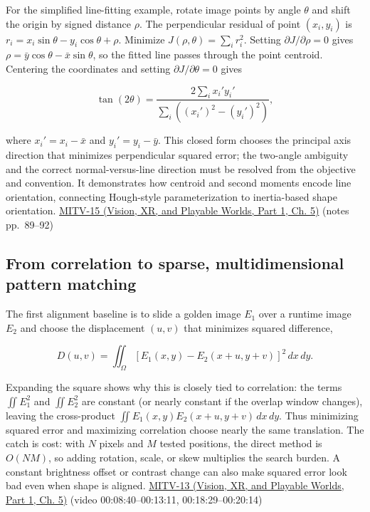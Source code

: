 For the simplified line-fitting example, rotate image points by angle \(\theta\) and shift the origin by signed distance \(\rho\). The perpendicular residual of point \((x_i,y_i)\) is \(r_i=x_i\sin\theta-y_i\cos\theta+\rho\). Minimize \(J(\rho,\theta)=\sum_i r_i^2\). Setting \(\partial J/\partial\rho=0\) gives \(\rho=\bar{y}\cos\theta-\bar{x}\sin\theta\), so the fitted line passes through the point centroid. Centering the coordinates and setting \(\partial J/\partial\theta=0\) gives

\[
\tan(2\theta)=\frac{2\sum_i x_i'y_i'}{\sum_i((x_i')^2-(y_i')^2)},
\]

where \(x_i'=x_i-\bar{x}\) and \(y_i'=y_i-\bar{y}\). This closed form chooses the principal axis direction that minimizes perpendicular squared error; the two-angle ambiguity and the correct normal-versus-line direction must be resolved from the objective and convention. It demonstrates how centroid and second moments encode line orientation, connecting Hough-style parameterization to inertia-based shape orientation. \href{../07-Vision-XR-and-Playable-Worlds-P01/main.pdf\#nameddest=04-visual-computing-ii-ch036-mitv-15---alignment-patmax-distance-field-filtering-and-sub-sampling-us-7065262}{MITV-15 (Vision, XR, and Playable Worlds, Part 1, Ch. 5)} (notes pp.~89--92)

\subsection{From correlation to sparse, multidimensional pattern matching}\label{04-visual-computing-ii-ch030-from-correlation-to-sparse-multidimensional-pattern-matching}

\hypertarget{04-visual-computing-ii-ch030-from-correlation-to-sparse-multidimensional-pattern-matching}{}

The first alignment baseline is to slide a golden image \(E_1\) over a runtime image \(E_2\) and choose the displacement \((u,v)\) that minimizes squared difference,

\[
D(u,v)=\iint_\Omega [E_1(x,y)-E_2(x+u,y+v)]^2\,dx\,dy.
\]

Expanding the square shows why this is closely tied to correlation: the terms \(\iint E_1^2\) and \(\iint E_2^2\) are constant (or nearly constant if the overlap window changes), leaving the cross-product \(\iint E_1(x,y)E_2(x+u,y+v)\,dx\,dy\). Thus minimizing squared error and maximizing correlation choose nearly the same translation. The catch is cost: with \(N\) pixels and \(M\) tested positions, the direct method is \(O(NM)\), so adding rotation, scale, or skew multiplies the search burden. A constant brightness offset or contrast change can also make squared error look bad even when shape is aligned. \href{../07-Vision-XR-and-Playable-Worlds-P01/main.pdf\#nameddest=04-visual-computing-ii-ch036-mitv-13---object-detection-recognition-and-pose-determination-patquick-us-7016539}{MITV-13 (Vision, XR, and Playable Worlds, Part 1, Ch. 5)} (video 00:08:40--00:13:11, 00:18:29--00:20:14)

